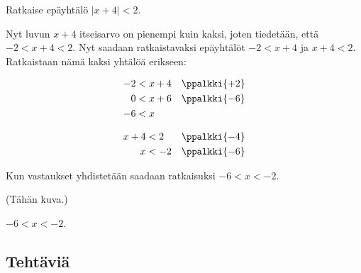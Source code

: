 \begin{esimerkki}
Ratkaise epäyhtälö $|x+4|<2$.

\begin{esimratk}
Nyt luvun $x+4$ itseisarvo on pienempi kuin kaksi, joten tiedetään, että $-2<x+4<2$. Nyt saadaan ratkaistavaksi epäyhtälöt $-2<x+4$ ja $x+4<2$. Ratkaistaan nämä kaksi yhtälöä erikseen:

\begin{align*}
-2&<x+4 & \ppalkki{+2} \\
0&<x+6 & \ppalkki{-6} \\
-6&<x &
\end{align*}

\begin{align*}
x+4&<2 & \ppalkki{-4} \\
x&<-2 & \ppalkki{-6}
\end{align*}

Kun vastaukset yhdistetään saadaan ratkaisuksi $-6<x<-2$.

(Tähän kuva.)

\end{esimratk}

\begin{esimvast}
$-6<x<-2$.
\end{esimvast}
\end{esimerkki}


\subsection*{Tehtäviä}

